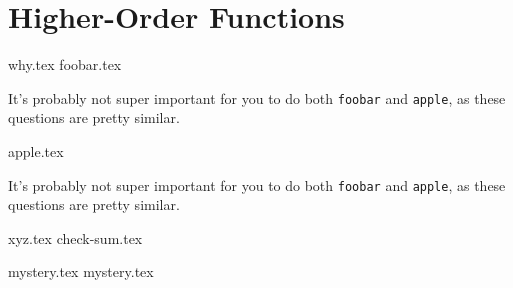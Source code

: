\documentclass{exam}
\begin{document}
\section{Higher-Order Functions}
\begin{questions}
{why.tex}
{foobar.tex}
\begin{questionmeta}
    It's probably not super important for you to do both \lstinline{foobar} and \lstinline{apple}, as these questions are pretty similar. 
\end{questionmeta}
{apple.tex}
\begin{questionmeta}
    It's probably not super important for you to do both \lstinline{foobar} and \lstinline{apple}, as these questions are pretty similar. 
\end{questionmeta}

{xyz.tex}
{check-sum.tex}

{mystery.tex}
{mystery.tex}
\clearpage

\end{questions}
\end{document}
